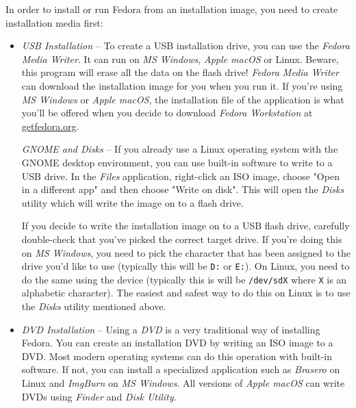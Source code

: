 In order to install or run Fedora from an installation image, you need to create installation media first:
\begin{itemize}
\item\emph{USB Installation} -- To create a USB installation drive, you can use the \emph{Fedora Media Writer}. It can run on \emph{MS Windows}, \emph{Apple macOS} or Linux. Beware, this program will erase all the data on the flash drive! \emph{Fedora Media Writer} can download the installation image for you when you run it. If you're using \emph{MS Windows} or \emph{Apple macOS}, the installation file of the application is what you'll be offered when you decide to download \emph{Fedora Workstation} at \url{getfedora.org}.

\emph{GNOME and Disks} -- If you already use a Linux operating system with the GNOME desktop environment, you can use built-in software to write to a USB drive. In the \emph{Files} application, right-click an ISO image, choose "Open in a different app" and then choose "Write on disk". This will open the \emph{Disks} utility which will write the image on to a flash drive.

If you decide to write the installation image on to a USB flash drive, carefully double-check that you've picked the correct target drive. If you're doing this on \emph{MS Windows}, you need to pick the character that has been assigned to the drive you'd like to use (typically this will be \texttt{D:} or \texttt{E:}). On Linux, you need to do the same using the device (typically this is will be \texttt{/dev/sdX} where \texttt{X} is an alphabetic character). The easiest and safest way to do this on Linux is to use the \emph{Disks} utility mentioned above.

\item\emph{DVD Installation} -- Using a \emph{DVD} is a very traditional way of installing Fedora. You can create an installation DVD by writing an ISO image to a DVD. Most modern operating systems can do this operation with built-in software. If not, you can install a specialized application such as \emph{Brasero} on Linux and \emph{ImgBurn} on \emph{MS Windows}. All versions of \emph{Apple macOS} can write DVDs using \emph{Finder} and \emph{Disk Utility}.
\end{itemize}

